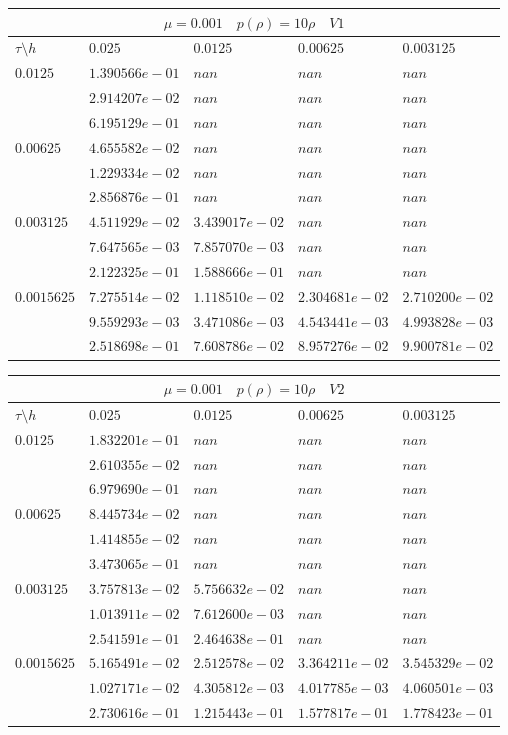 \documentclass[a4paper,12pt]{extarticle}
\begin{document}
\begin{tabular}{|l|l|l|l|l|}
	\hline
	\multicolumn{5}{|c|}{$\mu =0.001 \quad  p(\rho) =10 \rho \quad V1$}\\
	\hline
	$\tau\setminus h$ & $0.025$ & $0.0125$ & $0.00625$ & $0.003125$\\
	\hline
	$0.0125$  & $1.390566e-01$ & $nan$ & $nan$ & $nan$\\
	& $2.914207e-02$ & $nan$ & $nan$ & $nan$\\
	& $6.195129e-01$ & $nan$ & $nan$ & $nan$\\
	\hline
	$0.00625$  & $4.655582e-02$ & $nan$ & $nan$ & $nan$\\
	& $1.229334e-02$ & $nan$ & $nan$ & $nan$\\
	& $2.856876e-01$ & $nan$ & $nan$ & $nan$\\
	\hline
	$0.003125$  & $4.511929e-02$ & $3.439017e-02$ & $nan$ & $nan$\\
	& $7.647565e-03$ & $7.857070e-03$ & $nan$ & $nan$\\
	& $2.122325e-01$ & $1.588666e-01$ & $nan$ & $nan$\\
	\hline
	$0.0015625$  & $7.275514e-02$ & $1.118510e-02$ & $2.304681e-02$ & $2.710200e-02$\\
	& $9.559293e-03$ & $3.471086e-03$ & $4.543441e-03$ & $4.993828e-03$\\
	& $2.518698e-01$ & $7.608786e-02$ & $8.957276e-02$ & $9.900781e-02$\\
	\hline
\end{tabular}

\begin{tabular}{|l|l|l|l|l|}
	\hline
	\multicolumn{5}{|c|}{$\mu =0.001 \quad  p(\rho) =10 \rho \quad V2$}\\
	\hline
	$\tau\setminus h$ & $0.025$ & $0.0125$ & $0.00625$ & $0.003125$\\
	\hline
	$0.0125$  & $1.832201e-01$ & $nan$ & $nan$ & $nan$\\
	& $2.610355e-02$ & $nan$ & $nan$ & $nan$\\
	& $6.979690e-01$ & $nan$ & $nan$ & $nan$\\
	\hline
	$0.00625$  & $8.445734e-02$ & $nan$ & $nan$ & $nan$\\
	& $1.414855e-02$ & $nan$ & $nan$ & $nan$\\
	& $3.473065e-01$ & $nan$ & $nan$ & $nan$\\
	\hline
	$0.003125$  & $3.757813e-02$ & $5.756632e-02$ & $nan$ & $nan$\\
	& $1.013911e-02$ & $7.612600e-03$ & $nan$ & $nan$\\
	& $2.541591e-01$ & $2.464638e-01$ & $nan$ & $nan$\\
	\hline
	$0.0015625$  & $5.165491e-02$ & $2.512578e-02$ & $3.364211e-02$ & $3.545329e-02$\\
	& $1.027171e-02$ & $4.305812e-03$ & $4.017785e-03$ & $4.060501e-03$\\
	& $2.730616e-01$ & $1.215443e-01$ & $1.577817e-01$ & $1.778423e-01$\\
	\hline
\end{tabular}
\end{document}
